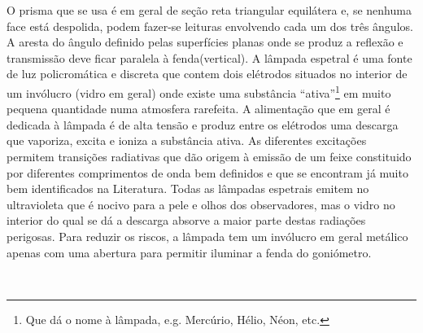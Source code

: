\documentclass[a4paper,12pt]{article}  %
\begin{document}




O prisma que se usa é em geral de seção reta triangular equilátera e, se nenhuma face está despolida, podem fazer-se leituras envolvendo cada um dos três ângulos. A aresta do ângulo definido pelas superfícies planas onde se produz a reflexão e transmissão deve ficar paralela à fenda(vertical).
A lâmpada espetral é uma fonte de luz policromática e discreta que contem dois elétrodos situados no interior de um invólucro (vidro em geral) onde existe uma substância “ativa”\footnote{Que dá o nome à lâmpada, e.g. Mercúrio, Hélio, Néon, etc.} em muito pequena quantidade numa atmosfera rarefeita. A alimentação que em geral é dedicada à lâmpada é de alta tensão e produz entre os elétrodos uma descarga que vaporiza, excita e ioniza a substância ativa. As diferentes excitações permitem transições radiativas que dão origem à emissão de um feixe constituido por diferentes comprimentos de onda bem definidos e que se encontram já muito bem identificados na Literatura. 
Todas as lâmpadas espetrais emitem no ultravioleta que é nocivo para a pele e olhos dos observadores, mas o vidro no interior do qual se dá a descarga absorve a maior parte destas radiações perigosas. Para reduzir os riscos, a lâmpada tem um invólucro em geral metálico apenas com uma abertura para permitir iluminar a fenda do goniómetro.

~
\newpage
\end{document}
